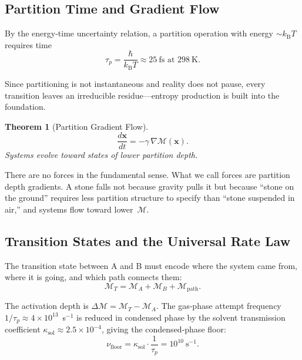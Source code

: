 \documentclass[11pt,twocolumn,a4paper]{article}
\newtheorem{theorem}{Theorem}[section]
\theoremstyle{definition}
\theoremstyle{remark}
\newcommand{\kB}{k_{\mathrm{B}}}
\newcommand{\Depth}{\mathcal{M}}
\newcommand{\nufloor}{\nu_{\mathrm{floor}}}
\begin{document}
\subsection{Partition Time and Gradient Flow}

By the energy-time uncertainty relation, a partition operation with energy
$\sim\kB T$ requires time
\begin{equation}
    \tau_p = \frac{\hbar}{\kB T} \approx 25~\text{fs at }298~\text{K}.
    \label{eq:tauP}
\end{equation}

Since partitioning is not instantaneous and reality does not pause, every
transition leaves an irreducible residue---entropy production is built into
the foundation.

\begin{theorem}[Partition Gradient Flow]
\label{thm:gradient}
\begin{equation}
    \frac{d\mathbf{x}}{dt} = -\gamma\,\nabla\Depth(\mathbf{x}).
\end{equation}
Systems evolve toward states of lower partition depth.
\end{theorem}

There are no forces in the fundamental sense.  What we call forces are
partition depth gradients.  A stone falls not because gravity pulls it but
because ``stone on the ground'' requires less partition structure to specify
than ``stone suspended in air,'' and systems flow toward lower~$\Depth$.

\subsection{Transition States and the Universal Rate Law}

The transition state between A and B must encode where the system came from,
where it is going, and which path connects them:
\[
    \Depth_T = \Depth_A + \Depth_B + \Depth_{\mathrm{path}}.
\]

The activation depth is $\Delta\Depth = \Depth_T - \Depth_A$.  The
gas-phase attempt frequency $1/\tau_p \approx 4\times10^{13}$~s$^{-1}$ is
reduced in condensed phase by the solvent transmission coefficient
$\kappa_{\mathrm{sol}} \approx 2.5\times10^{-4}$, giving the condensed-phase
floor:
\begin{equation}
    \nufloor = \kappa_{\mathrm{sol}} \cdot \frac{1}{\tau_p} = 10^{10}~\text{s}^{-1}.
    \label{eq:nufloor}
\end{equation}
\end{document}

